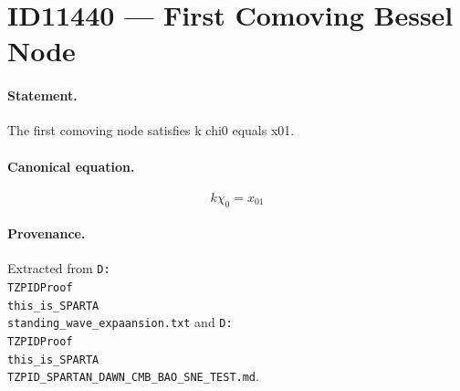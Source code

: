 \section*{ID11440 --- First Comoving Bessel Node}

\paragraph{Statement.}
The first comoving node satisfies k chi0 equals x01.

\paragraph{Canonical equation.}
\[
k\chi_0=x_{01}
\]

\paragraph{Provenance.}
Extracted from \texttt{D:\\TZPIDProof\\this\_is\_SPARTA\\standing\_wave\_expaansion.txt} and \texttt{D:\\TZPIDProof\\this\_is\_SPARTA\\TZPID\_SPARTAN\_DAWN\_CMB\_BAO\_SNE\_TEST.md}.
